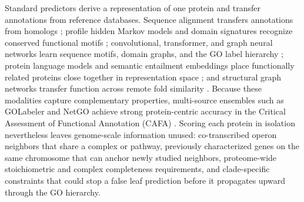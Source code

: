 \documentclass[10pt,twocolumn]{article}
\begin{document}
Standard predictors derive a representation of one protein and transfer annotations from reference databases. Sequence alignment transfers annotations from homologs \citep{buchfink2021sensitive,li2021refseq,schwengers2021bakta}; profile hidden Markov models and domain signatures recognize conserved functional motifs \citep{eddy2011accelerated,jones2014interproscan}; convolutional, transformer, and graph neural networks learn sequence motifs, domain graphs, and the GO label hierarchy \citep{kulmanov2018deepgo,kulmanov2020deepgoplus,you2021deepgraphgo,cao2021tale}; protein language models and semantic entailment embeddings place functionally related proteins close together in representation space \citep{lin2023evolutionary,elnaggar2021prottrans,yuan2023fast,kulmanov2024deepgose,yu2023enzyme}; and structural graph networks transfer function across remote fold similarity \citep{gligorijevic2021structure,vankempen2024foldseek,ding2025dpfunc}. Because these modalities capture complementary properties, multi-source ensembles such as GOLabeler \citep{you2018golabeler} and NetGO \citep{you2019netgo,wang2023netgo3} achieve strong protein-centric accuracy in the Critical Assessment of Functional Annotation (CAFA) \citep{radivojac2013large,jiang2016expanded,zhou2019cafa}. Scoring each protein in isolation nevertheless leaves genome-scale information unused: co-transcribed operon neighbors that share a complex or pathway, previously characterized genes on the same chromosome that can anchor newly studied neighbors, proteome-wide stoichiometric and complex completeness requirements, and clade-specific constraints that could stop a false leaf prediction before it propagates upward through the GO hierarchy.
\end{document}
